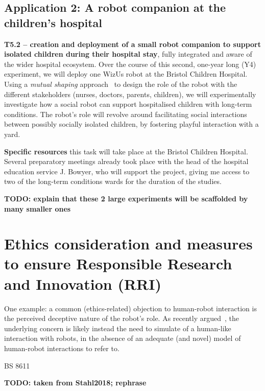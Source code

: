 \documentclass[11pt,a4paper]{report}
\newcommand{\project}{WizUs\xspace}
\newcommand{\TODO}[1]{{\color{red}\textbf{TODO: #1}}}
\begin{document}
\subsection{Application 2: A robot companion at the children's hospital}
\textbf{T5.2 -- creation and deployment of a small robot companion to support
isolated children during their hospital stay}, fully integrated and aware of the
wider hospital ecosystem. Over the course of this second, one-year long (Y4)
experiment, we will deploy one \project robot at the Bristol Children Hospital.
Using a \emph{mutual shaping} approach~\cite{winkle2018social} to design the
role of the robot with the different stakeholders (nurses, doctors, parents,
children), we will experimentally investigate how a social robot can support
hospitalised children with long-term conditions. The robot's role will revolve
around facilitating social interactions between possibly socially isolated
children, by fostering playful interaction with a yard.

\textbf{Specific resources} this task will take place at the Bristol Children
Hospital. Several preparatory meetings already took place with the head of the
hospital education service J. Bowyer, who will support the project, giving me
access to two of the long-term conditions wards for the duration of the studies.



\TODO{explain that these 2 large experiments will be scaffolded by many smaller
ones}

\newpage
\section{Ethics consideration and measures to ensure Responsible Research and Innovation (RRI)}



One example: a common (ethics-related) objection to human-robot interaction is
the perceived deceptive nature of the robot's role. As recently
argued~\cite{biscontilucidi2018companion}, the underlying concern is likely
instead the need to simulate of a human-like interaction with robots, in the
absence of an adequate (and novel) model of human-robot interactions to refer
to.


BS 8611~\cite{bsi2016robots}
~\cite{stahl2018implementing}


\TODO{taken from Stahl2018; rephrase}
\end{document}
